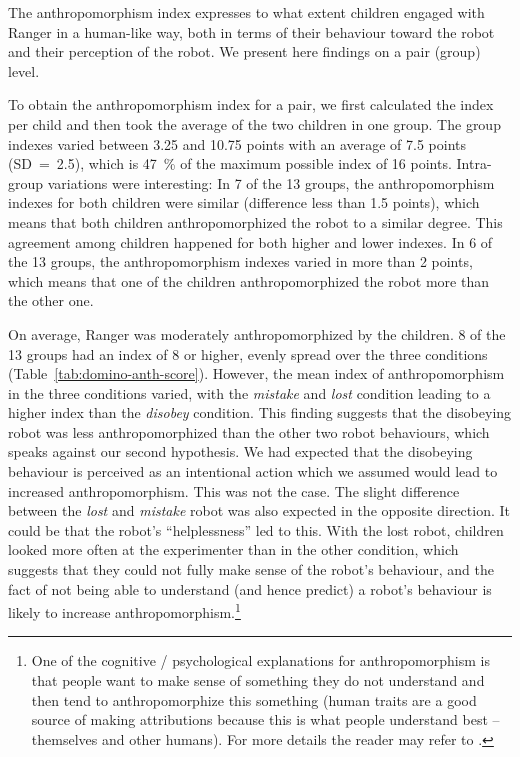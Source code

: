 \documentclass{sig-alternate}
\begin{document}
The anthropomorphism index expresses to what extent children engaged with Ranger
in a human-like way, both in terms of their behaviour toward the robot and their
perception of the robot. We present here findings on a pair (group) level.

To obtain the anthropomorphism index for a pair, we first calculated the index
per child and then took the average of the two children in one group.  The group
indexes varied between 3.25 and 10.75 points with an average of 7.5 points
(SD~=~2.5), which is 47~\% of the maximum possible index of 16 points.
Intra-group variations were interesting: In 7 of the 13 groups, the
anthropomorphism indexes for both children were similar (difference less than
1.5 points), which means that both children anthropomorphized the robot to a
similar degree. This agreement among children happened for both higher and lower
indexes. In 6 of the 13 groups, the anthropomorphism indexes varied in more than
2 points, which means that one of the children anthropomorphized the robot more
than the other one.

On average, Ranger was moderately anthropomorphized by the
children. 8 of the 13 groups had an index of 8 or higher, evenly spread
over the three conditions (Table~\ref{tab:domino-anth-score}). However, the mean
index of anthropomorphism in the three conditions varied, with the
\textit{mistake} and \textit{lost} condition leading to a higher index than the
\textit{disobey} condition. This finding suggests that the disobeying robot was
less anthropomorphized than the other two robot behaviours, which speaks against
our second hypothesis. We had expected that the disobeying behaviour is
perceived as an intentional action which we assumed would lead to increased
anthropomorphism. This was not the case. The slight difference between the
\textit{lost} and \textit{mistake} robot was also expected in the opposite
direction. It could be that the robot's ``helplessness'' led to this. With the
lost robot, children looked more often at the experimenter than in the other
condition, which suggests that they could not fully make sense of the robot's
behaviour, and the fact of not being able to understand (and hence predict) a
robot's behaviour is likely to increase anthropomorphism.\footnote{One of the
cognitive / psychological explanations for anthropomorphism is that people
want to make sense of something they do not understand and then tend to
anthropomorphize this something (human traits are a good source of making
attributions because this is what people understand best -- themselves and
other humans). For more details the reader may refer to
\cite{epley_seeing_2007}.}
\end{document}
